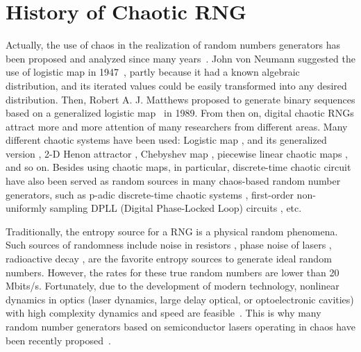 \section{History of Chaotic RNG}
Actually, the use of chaos in the realization of random numbers generators has been proposed and analyzed since many years~\cite{kellert1994wake, Eckhardt87, liyorke1975, Wu20051195,gleick2011chaos,gleick2011chaos}. John von Neumann suggested the use of logistic map in 1947~\cite{Eckhardt87}, partly because it had a known algebraic distribution, and its iterated values could be easily transformed into any desired distribution. Then, Robert A. J. Matthews proposed to generate binary sequences based on a generalized logistic map~\cite{Matthews:1984:DLE:67071.67073} in 1989. From then
on, digital chaotic RNGs attract more and more attention of many researchers
from different areas. Many different chaotic systems have been used: Logistic map \cite{ethesis69,ethesis74}, and its generalized version \cite{Matthews:1984:DLE:67071.67073}, 2-D Henon attractor \cite{ethesis67,ethesis95}, Chebyshev map \cite{ethesis75}, piecewise linear chaotic maps \cite{ethesis22,ethesis117}, and so on. Besides using chaotic maps,  in particular, discrete-time chaotic circuit have also been served as random sources in many chaos-based random number generators, such as
p-adic discrete-time chaotic systems \cite{ethesis86}, first-order non-uniformly sampling DPLL (Digital Phase-Locked Loop) circuits \cite{ethesis61}, etc.

Traditionally, the entropy source for a RNG is a physical random phenomena. Such sources of randomness
include  noise in resistors \cite{Cohen1988113}, phase noise of lasers \cite{Gay2001197}, radioactive decay \cite{Opendak1994570}, are the favorite entropy sources to generate ideal random numbers. However, the rates for these true random numbers are lower than 20 Mbits/s. Fortunately, due to the development of modern technology, nonlinear dynamics
in optics (laser dynamics, large delay optical, or optoelectronic cavities) with high complexity dynamics and speed are feasible~\cite{Larger2004609}. This is why many random number generators based on semiconductor lasers operating in chaos have been recently proposed~\cite{fast,ultrafast2009,ultrafast2010}.

    
